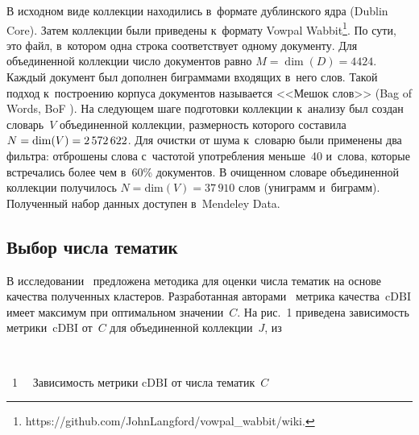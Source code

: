 \begin{multicols}{2}
    В исходном виде коллекции находились в~формате дублинского ядра (Dublin 
Core).
    Затем коллекции были приведены к~формату Vowpal 
Wabbit\footnote{{\sf https://github.com/JohnLangford/vowpal\_wabbit/wiki.}}.
    По сути, это файл, в~котором одна строка соответствует одному документу.
    Для объединенной коллекции число документов равно $M = \dim(D) = 4424$.
    Каждый документ был дополнен биграммами входящих в~него слов.
       Такой подход к~построению корпуса документов называется <<Мешок слов>>  
(Bag of Words, BoF \cite{harris1954distributional}).
    На следующем шаге подготовки коллекции к~анализу был создан словарь~$V$ 
объединенной коллекции,  размерность которого составила 
$N = \mathrm{dim}(V) \hm= 2\, 572\, 622 $.
       Для очистки от шума к~словарю были применены два фильтра: отброшены слова с~частотой употребления меньше~40 и~слова, которые встречались более чем в~60\% 
документов.
    В очищенном словаре объединенной коллекции получилось $N = \mathrm{dim} (V) = 
37\,910$ слов (униграмм и~биграмм).
    Полученный набор данных доступен в~Mendeley Data.
    
    \subsection{Выбор числа тематик}
    
    В исследовании~\cite{krasnov2019number} предложена методика для оценки 
числа тематик на основе качества полученных кластеров.
    Разработанная авторами~\cite{krasnov2019number} метрика качества~$\mathrm{cDBI}$ 
имеет максимум при оптимальном значении~$C$.
    На рис.~1 приведена зависимость 
    мет\-ри\-ки~$\mathrm{cDBI}$ 
    от~$C$ для объединенной коллекции~$J$, из\linebreak\vspace*{-12pt}
    
    

  
    { \begin{center}  %
 \vspace*{12pt}
    \mbox{%
 \epsfxsize=79mm 
 }

\vspace*{5pt}

\noindent
{{\figurename~1}\ \ \small{
Зависимость метрики $\mathrm{cDBI}$ от числа тематик~$C$
}}
\end{center}}



\end{multicols}
